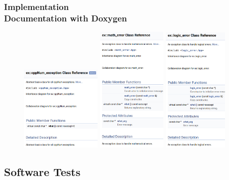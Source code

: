 \documentclass[ucs,10pt]{beamer}
\begin{document}
\begin{frame}
\frametitle{Implementation \\
        \small \color{rwth-blue} Documentation with Doxygen}
	\begin{figure}[b]
		\includegraphics[width=0.35\textwidth]{figures/cppNum_exception_doc.png}
                \includegraphics[width=0.3\textwidth]{figures/math_error_doc.png}
                \includegraphics[width=0.28\textwidth]{figures/logic_error_doc.png}
        \end{figure}
\end{frame}

\subsection{Software Tests}
\end{document}
